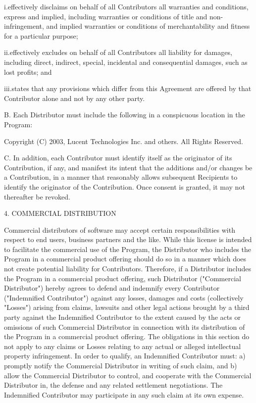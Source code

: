i.effectively disclaims on behalf of all Contributors all warranties
and conditions, express and implied, including warranties or
conditions of title and non-infringement, and implied warranties or
conditions of merchantability and fitness for a particular purpose; 

ii.effectively excludes on behalf of all Contributors all liability
for damages, including direct, indirect, special, incidental and
consequential damages, such as lost profits; and 

iii.states that any provisions which differ from this Agreement are
offered by that Contributor alone and not by any other party. 

B. Each Distributor must include the following in a conspicuous
location in the Program: 

Copyright (C) 2003, Lucent Technologies Inc. and others. All Rights
Reserved.

C. In addition, each Contributor must identify itself as the
originator of its Contribution, if any, and manifest its intent that
the additions and/or changes be a Contribution, in a manner that
reasonably allows subsequent Recipients to identify the originator of
the Contribution. Once consent is granted, it may not thereafter be
revoked. 

4. COMMERCIAL DISTRIBUTION 

Commercial distributors of software may accept certain
responsibilities with respect to end users, business partners and the
like. While this license is intended to facilitate the commercial use
of the Program, the Distributor who includes the Program in a
commercial product offering should do so in a manner which does not
create potential liability for Contributors. Therefore, if a
Distributor includes the Program in a commercial product offering,
such Distributor ("Commercial Distributor") hereby agrees to defend
and indemnify every Contributor ("Indemnified Contributor") against
any losses, damages and costs (collectively "Losses") arising from
claims, lawsuits and other legal actions brought by a third party
against the Indemnified Contributor to the extent caused by the acts
or omissions of such Commercial Distributor in connection with its
distribution of the Program in a commercial product offering. The
obligations in this section do not apply to any claims or Losses
relating to any actual or alleged intellectual property
infringement. In order to qualify, an Indemnified Contributor must: a)
promptly notify the Commercial Distributor in writing of such claim,
and b) allow the Commercial Distributor to control, and cooperate with
the Commercial Distributor in, the defense and any related settlement
negotiations. The Indemnified Contributor may participate in any such
claim at its own expense. 

